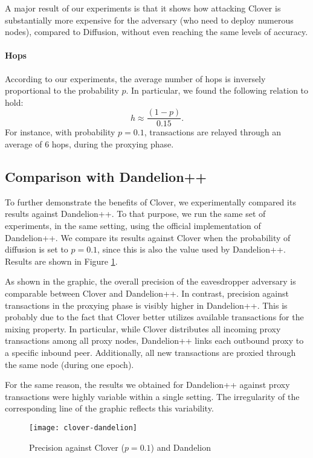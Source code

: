 \documentclass{article}
\begin{document}
	A major result of our experiments is that it shows how attacking Clover is substantially more expensive for the adversary (who need to deploy numerous nodes), compared to Diffusion, without even reaching the same levels of accuracy.
	
	\paragraph{Hops}
	According to our experiments, the average number of hops is inversely proportional to the probability $p$.
	In particular, we found the following relation to hold:
	\begin{equation}
		h \approx \frac{(1-p)}{0.15}  .
	\end{equation}
	For instance, with probability $p=0.1$, transactions are relayed through an average of 6 hops, during the proxying phase.
	
	
	\subsection{Comparison with Dandelion++}
	To further demonstrate the benefits of Clover, we experimentally compared its results against Dandelion++.
	To that purpose, we run the same set of experiments, in the same setting, using the official implementation of Dandelion++.
	We compare its results against Clover when the probability of diffusion is set to $p=0.1$, since this is also the value used by Dandelion++.
	Results are shown in Figure \ref{fig:results-dandelion}.
	
	As shown in the graphic, the overall precision of the eavesdropper adversary is comparable between Clover and Dandelion++.
	In contrast, precision against transactions in the proxying phase is visibly higher in Dandelion++.
	This is probably due to the fact that Clover better utilizes available transactions for the mixing property.
	In particular, while Clover distributes all incoming proxy transactions among all proxy nodes, Dandelion++ links each outbound proxy to a specific inbound peer. 
	Additionally, all new transactions are proxied through the same node (during one epoch).
	
	For the same reason, the results we obtained for Dandelion++ against proxy transactions were highly variable within a single setting.
	The irregularity of the corresponding line of the graphic reflects this variability.
	
	\begin{figure}[tbp]
		\centerline{\texttt{[image: clover-dandelion]}}
		\caption{Precision against Clover ($p{=}0.1$) and Dandelion}
		\label{fig:results-dandelion}
	\end{figure}
	
\end{document}
